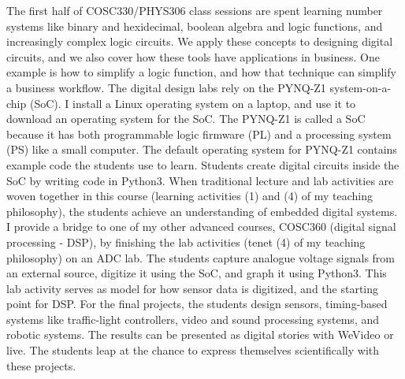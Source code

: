 \documentclass[../../../main.tex]{subfiles}
\begin{document}
The first half of COSC330/PHYS306 class sessions are spent learning number systems like binary and hexidecimal, boolean algebra and logic functions, and increasingly complex logic circuits.  We apply these concepts to designing digital circuits, and we also cover how these tools have applications in business.  One example is how to simplify a logic function, and how that technique can simplify a business workflow.  The digital design labs rely on the PYNQ-Z1 system-on-a-chip (SoC).  I install a Linux operating system on a laptop, and use it to download an operating system for the SoC.  The PYNQ-Z1 is called a SoC because it has both programmable logic firmware (PL) and a processing system (PS) like a small computer.  The default operating system for PYNQ-Z1 contains example code the students use to learn.  Students create digital circuits inside the SoC by writing code in Python3.  When traditional lecture and lab activities are woven together in this course (learning activities (1) and (4) of my teaching philosophy), the students achieve an understanding of embedded digital systems.
\\
\vspace{0.25cm}
I provide a bridge to one of my other advanced courses, COSC360 (digital signal processing - DSP), by finishing the lab activities (tenet (4) of my teaching philosophy) on an ADC lab.  The students capture analogue voltage signals from an external source, digitize it using the SoC, and graph it using Python3.  This lab activity serves as model for how sensor data is digitized, and the starting point for DSP.  For the final projects, the students design sensors, timing-based systems like traffic-light controllers, video and sound processing systems, and robotic systems.  The results can be presented as digital stories with WeVideo or live.  The students leap at the chance to express themselves scientifically with these projects.
\\
\vspace{0.25cm}
\end{document}
